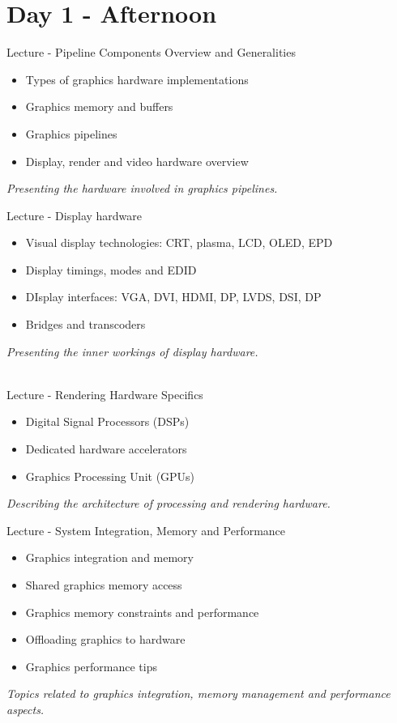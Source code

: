 \documentclass[a4paper,12pt,obeyspaces,spaces,hyphens]{article}
\begin{document}
\section{Day 1 - Afternoon}

\feagendatwocolumn
{Lecture - Pipeline Components Overview and Generalities}
{
  \begin{itemize}
  \item Types of graphics hardware implementations
  \item Graphics memory and buffers
  \item Graphics pipelines
  \item Display, render and video hardware overview
  \end{itemize}
  \vspace{0.5em}
  {\em Presenting the hardware involved in graphics pipelines.}
}
{Lecture - Display hardware}
{
  \begin{itemize}
  \item Visual display technologies: CRT, plasma, LCD, OLED, EPD
  \item Display timings, modes and EDID
  \item DIsplay interfaces: VGA, DVI, HDMI, DP, LVDS, DSI, DP
  \item Bridges and transcoders
  \end{itemize}
  \vspace{0.5em}
  {\em Presenting the inner workings of display hardware.}
}
\\

\feagendatwocolumn
{Lecture - Rendering Hardware Specifics}
{
  \begin{itemize}
  \item Digital Signal Processors (DSPs)
  \item Dedicated hardware accelerators
  \item Graphics Processing Unit (GPUs)
  \end{itemize}
  \vspace{0.5em}
  {\em Describing the architecture of processing and rendering hardware.}
}
{Lecture - System Integration, Memory and Performance}
{
  \begin{itemize}
  \item Graphics integration and memory
  \item Shared graphics memory access
  \item Graphics memory constraints and performance
  \item Offloading graphics to hardware
  \item Graphics performance tips
  \end{itemize}
  \vspace{0.5em}
  {\em Topics related to graphics integration, memory management and performance aspects.}
}
\end{document}
